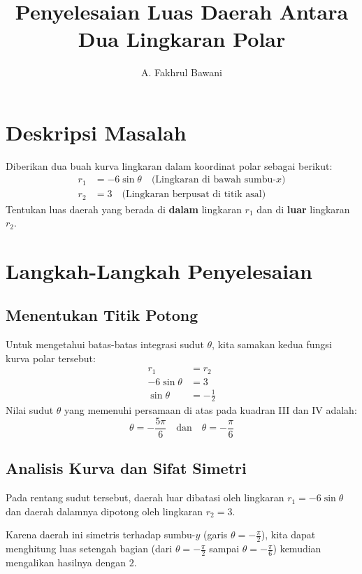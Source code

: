 \documentclass[11pt,a4paper]{article}
\title{\textbf{Penyelesaian Luas Daerah Antara Dua Lingkaran Polar}}
\author{A. Fakhrul Bawani}
\date{}
\begin{document}
\maketitle

\section{Deskripsi Masalah}
Diberikan dua buah kurva lingkaran dalam koordinat polar sebagai berikut:
\begin{align}
  r_1 &= -6\sin\theta \quad \text{(Lingkaran di bawah sumbu-}x\text{)} \\
  r_2 &= 3 \quad \text{(Lingkaran berpusat di titik asal)}
\end{align}
Tentukan luas daerah yang berada di \textbf{dalam} lingkaran $r_1$ dan di \textbf{luar} lingkaran $r_2$.

\section{Langkah-Langkah Penyelesaian}

\subsection{Menentukan Titik Potong}
Untuk mengetahui batas-batas integrasi sudut $\theta$, kita samakan kedua fungsi kurva polar tersebut:
\begin{align*}
  r_1 &= r_2 \\
  -6\sin\theta &= 3 \\
  \sin\theta &= -\frac{1}{2}
\end{align*}
Nilai sudut $\theta$ yang memenuhi persamaan di atas pada kuadran III dan IV adalah:
\begin{equation}
  \theta = -\frac{5\pi}{6} \quad \text{dan} \quad \theta = -\frac{\pi}{6}
\end{equation}

\subsection{Analisis Kurva dan Sifat Simetri}
Pada rentang sudut tersebut, daerah luar dibatasi oleh lingkaran $r_1 = -6\sin\theta$ dan daerah dalamnya dipotong oleh lingkaran $r_2 = 3$. 

Karena daerah ini simetris terhadap sumbu-$y$ (garis $\theta = -\frac{\pi}{2}$), kita dapat menghitung luas setengah bagian (dari $\theta = -\frac{\pi}{2}$ sampai $\theta = -\frac{\pi}{6}$) kemudian mengalikan hasilnya dengan $2$.
\end{document}
